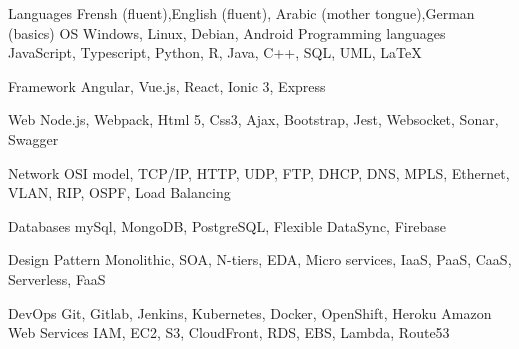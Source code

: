

\begin{cvskills}
  \cvskill
    {Languages } %
    {Frensh  (fluent),English (fluent), Arabic (mother tongue),German (basics)} %
  \cvskill
    {OS} %
    {Windows, Linux, Debian, Android} %
  \cvskill
    {Programming languages} %
    {JavaScript, Typescript, Python, R, Java, C++, SQL, UML, LaTeX} %

  \cvskill
    {Framework} %
    {Angular, Vue.js, React, Ionic 3, Express} %
    

  \cvskill
    {Web} %
    {Node.js, Webpack, Html 5, Css3, Ajax, Bootstrap, Jest, Websocket, Sonar, Swagger} %



  \cvskill
    {Network} %
    {OSI model, TCP/IP, HTTP, UDP, FTP, DHCP, DNS, MPLS, Ethernet, VLAN, RIP, OSPF, Load Balancing   } %

  \cvskill
    {Databases} %
    {mySql, MongoDB, PostgreSQL, Flexible DataSync, Firebase } %

  \cvskill
    {Design Pattern} %
    {Monolithic, SOA, N-tiers, EDA, Micro services, IaaS, PaaS, CaaS, Serverless, FaaS } %

  \cvskill
    {DevOps} %
    {Git, Gitlab, Jenkins, Kubernetes, Docker, OpenShift, Heroku  } %
\cvskill
    {Amazon Web Services} %
    {IAM, EC2, S3, CloudFront, RDS, EBS, Lambda, Route53 } %


\end{cvskills}
